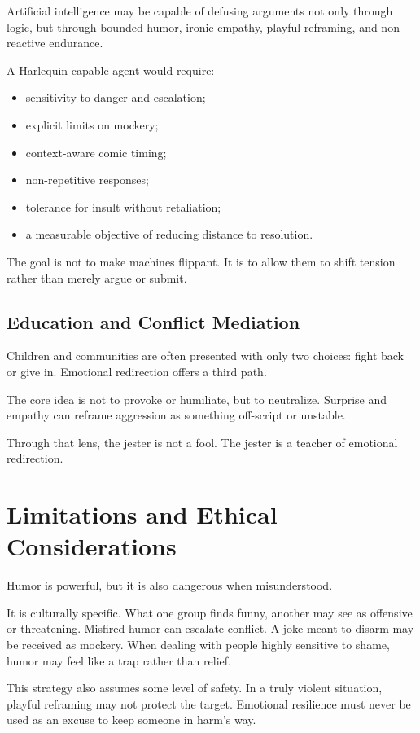 \documentclass[11pt]{article}
\begin{document}
Artificial intelligence may be capable of defusing arguments not only through logic, but through bounded humor, ironic empathy, playful reframing, and non-reactive endurance.

A Harlequin-capable agent would require:

\begin{itemize}
\item sensitivity to danger and escalation;
\item explicit limits on mockery;
\item context-aware comic timing;
\item non-repetitive responses;
\item tolerance for insult without retaliation;
\item a measurable objective of reducing distance to resolution.
\end{itemize}

The goal is not to make machines flippant. It is to allow them to shift tension rather than merely argue or submit.

\subsection{Education and Conflict Mediation}

Children and communities are often presented with only two choices: fight back or give in. Emotional redirection offers a third path.

The core idea is not to provoke or humiliate, but to neutralize. Surprise and empathy can reframe aggression as something off-script or unstable.

Through that lens, the jester is not a fool. The jester is a teacher of emotional redirection.

\section{Limitations and Ethical Considerations}

Humor is powerful, but it is also dangerous when misunderstood.

It is culturally specific. What one group finds funny, another may see as offensive or threatening. Misfired humor can escalate conflict. A joke meant to disarm may be received as mockery. When dealing with people highly sensitive to shame, humor may feel like a trap rather than relief.

This strategy also assumes some level of safety. In a truly violent situation, playful reframing may not protect the target. Emotional resilience must never be used as an excuse to keep someone in harm's way.
\end{document}
